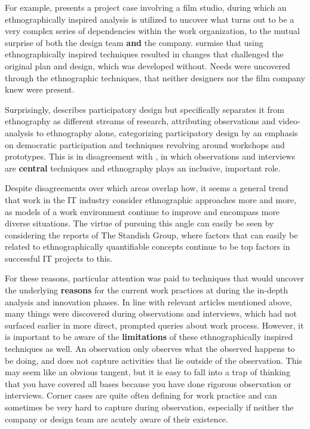 For example, \cite{simonsen1997using} presents a project case involving a film
studio, during which an ethnographically inspired analysis is utilized to
uncover what turns out to be a very complex series of dependencies within the
work organization, to the mutual surprise of both the design team \textbf{and}
the company. \cite{simonsen1997using} surmise that using ethnographically inspired techniques
resulted in changes that challenged the original plan and design, which was developed without.
Needs were uncovered through the ethnographic techniques, that neither designers nor
the film company knew were present.

Surprisingly, \cite{kujala2003user} describes participatory design but specifically separates it from
ethnography as different streams of research, attributing observations and video-analysis to ethnography 
alone, categorizing participatory design by an emphasis on democratic participation and techniques revolving 
around workshops and prototypes. This is in disagreement with \cite{bodker204participatory}, in which
observations and interviews are \textbf{central} techniques and ethnography plays an inclusive, important role.

Despite disagreements over which areas overlap how, it seems a general trend that work in the IT industry consider
ethnographic approaches more and more, as models of a work environment continue to improve and encompass more diverse
situations. The virtue of pursuing this angle can easily be seen by considering the reports of The Standish Group, where
factors that can easily be related to ethnographically quantifiable concepts continue to be top factors in successful IT
projects to this\cite{standish2012}.

For these reasons, particular attention was paid to techniques that would uncover the underlying \textbf{reasons} for
the current work practices at \gomonkey{} during the in-depth analysis and innovation phases. In line with relevant
articles mentioned above, many things were discovered during observations and interviews, which had not surfaced earlier
in more direct, prompted queries about work process. However, it is important to be aware of the \textbf{limitations} of
these ethnographically inspired techniques as well. An observation only observes what the observed happens to be doing, and
does not capture activities that lie outside of the observation. This may seem like an obvious tangent, but it is easy to fall
into a trap of thinking that you have covered all bases because you have done rigorous observation or interviews. Corner cases
are quite often defining for work practice and can sometimes be very hard to capture during observation, especially if neither
the company or design team are acutely aware of their existence.

